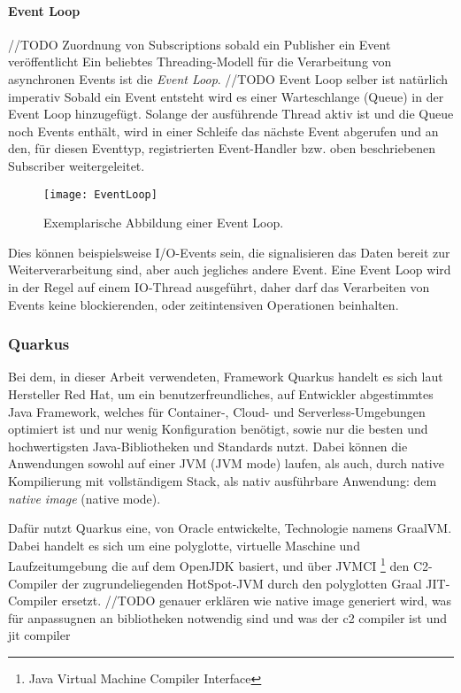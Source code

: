 \paragraph{Event Loop}
\label{section:event_loop}
//TODO Zuordnung von Subscriptions sobald ein Publisher ein Event veröffentlicht
Ein beliebtes Threading-Modell für die Verarbeitung von asynchronen Events ist die \textit{Event Loop}. //TODO Event Loop selber ist natürlich imperativ
Sobald ein Event entsteht wird es einer Warteschlange (Queue)
in der Event Loop hinzugefügt. Solange der ausführende Thread aktiv ist und die Queue noch Events enthält, wird in einer Schleife das nächste Event
abgerufen und an den, für diesen Eventtyp, registrierten Event-Handler bzw. oben beschriebenen Subscriber weitergeleitet.
\begin{figure}[h!]
	\centering
	\texttt{[image: EventLoop]}
	\caption{Exemplarische Abbildung einer Event Loop. \parencite[Kapitel 1.7]{Ponge2020}}
\end{figure}

Dies können beispielsweise I/O-Events sein, die signalisieren das Daten bereit zur Weiterverarbeitung sind, aber auch jegliches andere Event.
Eine Event Loop wird in der Regel auf einem IO-Thread ausgeführt, daher darf das Verarbeiten von Events
keine blockierenden, oder zeitintensiven Operationen beinhalten\parencite{Ponge2020}.

\subsubsection{Quarkus}
\label{section:Quarkus}

Bei dem, in dieser Arbeit verwendeten, Framework Quarkus handelt es sich laut Hersteller Red Hat, um ein
benutzerfreundliches, auf Entwickler abgestimmtes Java Framework, welches für Container-, Cloud- und Serverless-Umgebungen optimiert ist und nur wenig
Konfiguration benötigt, sowie nur die besten und hochwertigsten Java-Bibliotheken und Standards nutzt.
Dabei können die Anwendungen sowohl auf einer JVM (JVM mode) laufen, als auch, durch native Kompilierung mit vollständigem Stack,
als nativ ausführbare Anwendung: dem \textit{native image} (native mode).

Dafür nutzt Quarkus eine, von Oracle entwickelte, Technologie namens GraalVM.
Dabei handelt es sich um eine polyglotte, virtuelle Maschine und Laufzeitumgebung die auf dem OpenJDK basiert, und über
JVMCI \footnote{Java Virtual Machine Compiler Interface} den C2-Compiler der zugrundeliegenden HotSpot-JVM durch den polyglotten Graal JIT-Compiler ersetzt.\parencite{GraalVM}
//TODO genauer erklären wie native image generiert wird, was für anpassugnen an bibliotheken notwendig sind und was der c2 compiler ist und jit compiler

